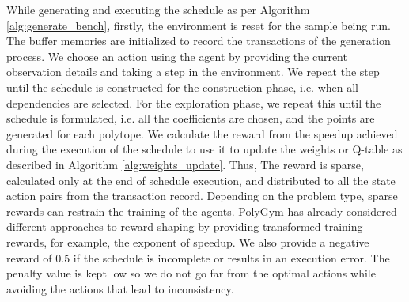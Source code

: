 \documentclass[logo,msc]{infthesis}           %
\begin{document}

While generating and executing the schedule as per Algorithm \ref{alg:generate_bench}, firstly, the environment is reset for the sample being run. The buffer memories are initialized to record the transactions of the generation process. We choose an action using the agent by providing the current observation details and taking a step in the environment. We repeat the step until the schedule is constructed for the construction phase, i.e. when all dependencies are selected. For the exploration phase, we repeat this until the schedule is formulated, i.e. all the coefficients are chosen, and the points are generated for each polytope. We calculate the reward from the speedup achieved during the execution of the schedule to use it to update the weights or Q-table as described in Algorithm \ref{alg:weights_update}. Thus, The reward is sparse, calculated only at the end of schedule execution, and distributed to all the state action pairs from the transaction record. Depending on the problem type, sparse rewards can restrain the training of the agents. PolyGym has already considered different approaches to reward shaping by providing transformed training rewards, for example, the exponent of speedup\cite{Wiewiora2010}. We also provide a negative reward of 0.5 if the schedule is incomplete or results in an execution error. The penalty value is kept low so we do not go far from the optimal actions while avoiding the actions that lead to inconsistency.
\end{document}
